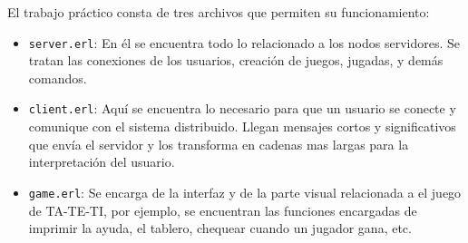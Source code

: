 \documentclass[a4paper]{article}
\newcommand{\blacktr}[0]{\item[$\blacktriangleright$]}
\begin{document}
El trabajo práctico consta de tres archivos que permiten su funcionamiento:
\begin{itemize}
  \blacktr \texttt{server.erl}: En él se encuentra todo lo relacionado a los nodos servidores. Se tratan las conexiones de los usuarios, creación de juegos, jugadas, y demás comandos.
  \blacktr \texttt{client.erl}: Aquí se encuentra lo necesario para que un usuario se conecte y comunique con el sistema distribuido. Llegan mensajes cortos y significativos que envía el servidor y los transforma en cadenas mas largas para la interpretación del usuario.
  \blacktr \texttt{game.erl}: Se encarga de la interfaz y de la parte visual relacionada a el juego de TA-TE-TI, por ejemplo, se encuentran las funciones encargadas de imprimir la ayuda, el tablero, chequear cuando un jugador gana, etc. 
\end{itemize}
\end{document}
